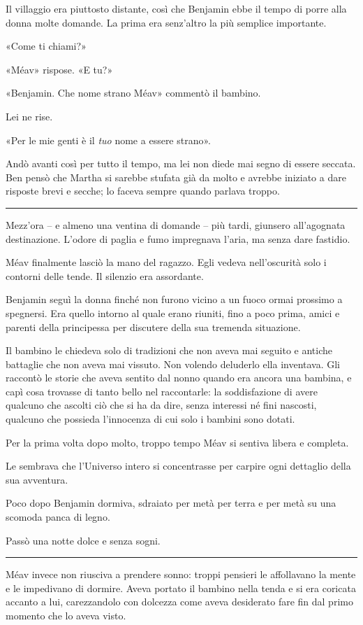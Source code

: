 \documentclass[a4paper,10pt]{memoir}
\begin{document}
Il villaggio era piuttosto distante, così che Benjamin ebbe il tempo di porre alla donna molte domande. La prima era
senz'altro la più semplice importante.

«Come ti chiami?»

«Méav» rispose. «E tu?»

«Benjamin. Che nome strano Méav» commentò il bambino.

Lei ne rise.

«Per le mie genti è il \emph{tuo} nome a essere strano».

Andò avanti così per tutto il tempo, ma lei non diede mai segno di essere seccata. Ben pensò che Martha si sarebbe
stufata già da molto e avrebbe iniziato a dare risposte brevi e secche; lo faceva sempre quando parlava troppo.

\plainbreak{1}

Mezz'ora -- e almeno una ventina di domande -- più tardi, giunsero all'agognata destinazione. L'odore di paglia e fumo
impregnava l'aria, ma senza dare fastidio.

Méav finalmente lasciò la mano del ragazzo. Egli vedeva nell'oscurità solo i contorni delle tende. Il silenzio era
assordante.

Benjamin seguì la donna finché non furono vicino a un fuoco ormai prossimo a spegnersi. Era quello intorno al quale
erano riuniti, fino a poco prima, amici e parenti della principessa per discutere della sua tremenda situazione.

Il bambino le chiedeva solo di tradizioni che non aveva mai seguito e antiche battaglie che non aveva mai vissuto. Non
volendo deluderlo ella inventava. Gli raccontò le storie che aveva sentito dal nonno quando era ancora una bambina, e
capì cosa trovasse di tanto bello nel raccontarle: la soddisfazione di avere qualcuno che ascolti ciò che si ha da dire,
senza interessi né fini nascosti, qualcuno che possieda l'innocenza di cui solo i bambini sono dotati.

Per la prima volta dopo molto, troppo tempo Méav si sentiva libera e completa.

Le sembrava che l'Universo intero si concentrasse per carpire ogni dettaglio della sua avventura.

Poco dopo Benjamin dormiva, sdraiato per metà per terra e per metà su una scomoda panca di legno.

Passò una notte dolce e senza sogni.

\plainbreak{1}

Méav invece non riusciva a prendere sonno: troppi pensieri le affollavano la mente e le impedivano di dormire. Aveva
portato il bambino nella tenda e si era coricata accanto a lui, carezzandolo con dolcezza come aveva desiderato fare fin
dal primo momento che lo aveva visto.
\end{document}
